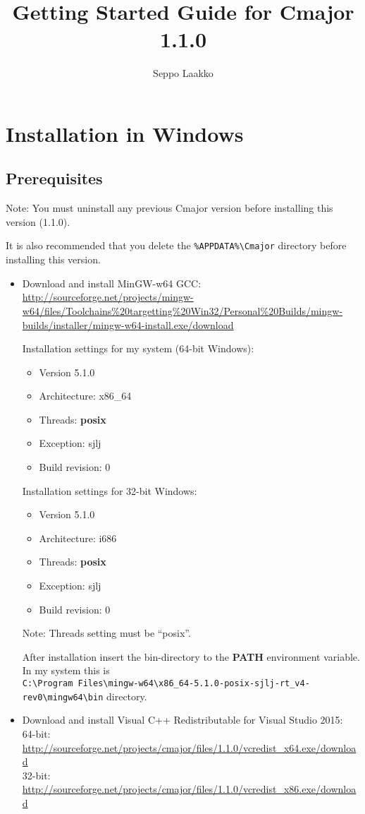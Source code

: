 \documentclass[oneside, a4paper, 11pt]{article}
\begin{document}
\title{Getting Started Guide for Cmajor 1.1.0}
\author{Seppo Laakko}
\maketitle

\section{Installation in Windows}

\subsection{Prerequisites}

Note:
You must uninstall any previous Cmajor version before installing
this version (1.1.0).

It is also recommended that you delete the
\verb|%APPDATA%\Cmajor| directory before installing
this version.

\begin{itemize}

\item
Download and install MinGW-w64 GCC:\\
\url{http://sourceforge.net/projects/mingw-w64/files/Toolchains%20targetting%20Win32/Personal%20Builds/mingw-builds/installer/mingw-w64-install.exe/download}

Installation settings for my system (64-bit Windows):
\begin{itemize}
\item
Version 5.1.0
\item
Architecture: x86\_64
\item
Threads: \textbf{posix}
\item
Exception: sjlj
\item
Build revision: 0
\end{itemize}

Installation settings for 32-bit Windows:
\begin{itemize}
\item
Version 5.1.0
\item
Architecture: i686
\item
Threads: \textbf{posix}
\item
Exception: sjlj
\item
Build revision: 0
\end{itemize}

Note: Threads setting must be ``posix''.

After installation insert the bin-directory to the \textbf{PATH} environment variable.
In my system this is\\
\verb|C:\Program Files\mingw-w64\x86_64-5.1.0-posix-sjlj-rt_v4-rev0\mingw64\bin| directory.

\item
Download and install Visual C++ Redistributable for Visual Studio 2015:\\
64-bit: \url{http://sourceforge.net/projects/cmajor/files/1.1.0/vcredist_x64.exe/download}\\
32-bit: \url{http://sourceforge.net/projects/cmajor/files/1.1.0/vcredist_x86.exe/download}
\end{itemize}
\end{document}
